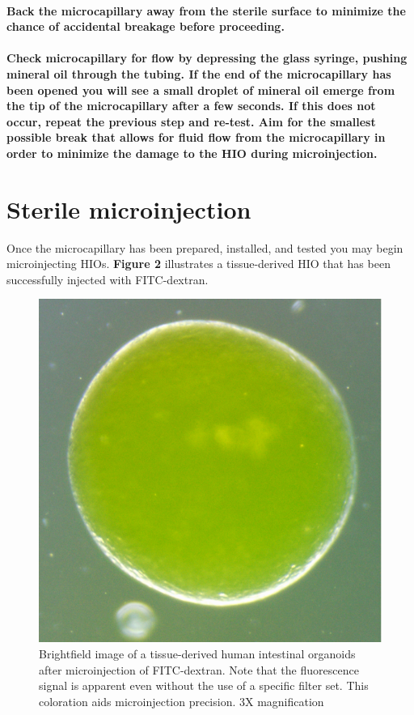 \documentclass[11pt]{article}
\begin{document}
\paragraph{{\bfseries\sffamily } Back the microcapillary away from the sterile surface to minimize the chance of accidental breakage before proceeding.}
\label{sec:orgheadline38}
\paragraph{{\bfseries\sffamily } Check microcapillary for flow by depressing the glass syringe, pushing mineral oil through the tubing. If the end of the microcapillary has been opened you will see a small droplet of mineral oil emerge from the tip of the microcapillary after a few seconds. If this does not occur, repeat the previous step and re-test. Aim for the smallest possible break that allows for fluid flow from the microcapillary in order to minimize the damage to the HIO during microinjection.}
\label{sec:orgheadline39}



\section{{\bfseries\sffamily } Sterile microinjection}
\label{sec:orgheadline57}
Once the microcapillary has been prepared, installed, and tested you may begin microinjecting HIOs. \textbf{Figure 2} illustrates a tissue-derived HIO that has been successfully injected with FITC-dextran.\\
\begin{figure}
\centering
\includegraphics[width=0.35\linewidth]{./img/figure3.pdf}
\caption{Brightfield image of a tissue-derived human intestinal organoids after microinjection of FITC-dextran. Note that the fluorescence signal is apparent even without the use of a specific filter set. This coloration aids microinjection precision. 3X magnification}
\end{figure}
\end{document}
